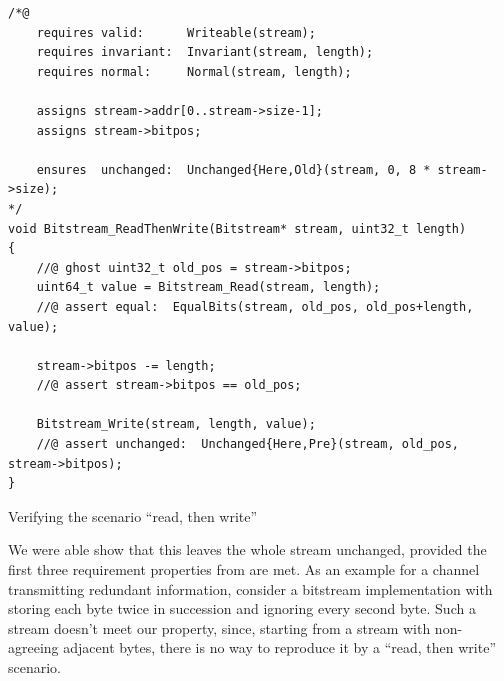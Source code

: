 \begin{listing}[hbt]
\begin{minipage}{0.99\textwidth}
\begin{lstlisting}[style=acsl-block]
/*@
    requires valid:      Writeable(stream);
    requires invariant:  Invariant(stream, length);
    requires normal:     Normal(stream, length);

    assigns stream->addr[0..stream->size-1];
    assigns stream->bitpos;

    ensures  unchanged:  Unchanged{Here,Old}(stream, 0, 8 * stream->size);
*/
void Bitstream_ReadThenWrite(Bitstream* stream, uint32_t length)
{
    //@ ghost uint32_t old_pos = stream->bitpos;
    uint64_t value = Bitstream_Read(stream, length);
    //@ assert equal:  EqualBits(stream, old_pos, old_pos+length, value);

    stream->bitpos -= length;
    //@ assert stream->bitpos == old_pos;

    Bitstream_Write(stream, length, value);
    //@ assert unchanged:  Unchanged{Here,Pre}(stream, old_pos, stream->bitpos);
}
\end{lstlisting}
\end{minipage}
\caption{\label{lst:Bitstream_ReadThenWrite}
	Verifying the scenario ``read, then write'' }
\end{listing}


\FloatBarrier


We were able show that this leaves the
whole stream unchanged, provided the first three requirement properties
from  are met.
%
As an example for a channel transmitting redundant information,
consider
a bitstream implementation
with 
storing each byte twice in succession and 
ignoring every second byte.
%
Such a stream doesn't meet our property, since, 
starting from a stream with non-agreeing adjacent bytes, there is no
way to reproduce it by a ``read, then write'' scenario.

